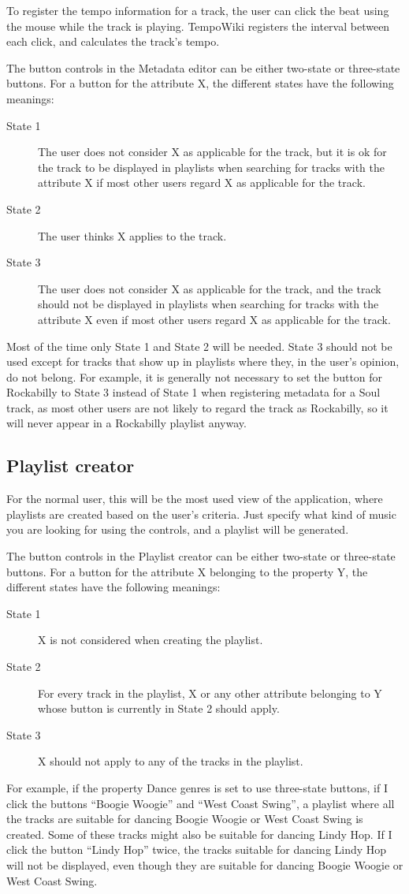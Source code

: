 \documentclass[a4paper, 12pt]{article}
\begin{document}
To register the tempo information for a track, the user can click the beat using the mouse while the track is playing. TempoWiki registers the interval between each click, and calculates the track's tempo.

The button controls in the Metadata editor can be either two-state or three-state buttons. For a button for the attribute X, the different states have the following meanings:
\begin{description}
	\item[State 1] The user does not consider X as applicable for the track, but it is ok for the track to be displayed in playlists when searching for tracks with the attribute X if most other users regard X as applicable for the track.
	\item[State 2] The user thinks X applies to the track.
	\item[State 3] The user does not consider X as applicable for the track, and the track should not be displayed in playlists when searching for tracks with the attribute X even if most other users regard X as applicable for the track.
\end{description}
Most of the time only State 1 and State 2 will be needed. State 3 should not be used except for tracks that show up in playlists where they, in the user's opinion, do not belong. For example, it is generally not necessary to set the button for Rockabilly to State 3 instead of State 1 when registering metadata for a Soul track, as most other users are not likely to regard the track as Rockabilly, so it will never appear in a Rockabilly playlist anyway.
\subsection{Playlist creator}
\label{sec:playlist}
For the normal user, this will be the most used view of the application, where playlists are created based on the user's criteria. Just specify what kind of music you are looking for using the controls, and a playlist will be generated.

The button controls in the Playlist creator can be either two-state or three-state buttons. For a button for the attribute X belonging to the property Y, the different states have the following meanings:
\begin{description}
	\item[State 1] X is not considered when creating the playlist.
	\item[State 2] For every track in the playlist, X or any other attribute belonging to Y whose button is currently in State 2 should apply.
	\item[State 3] X should not apply to any of the tracks in the playlist.
\end{description}
For example, if the property Dance genres is set to use three-state buttons, if I click the buttons ``Boogie Woogie'' and ``West Coast Swing'', a playlist where all the tracks are suitable for dancing Boogie Woogie or West Coast Swing is created. Some of these tracks might also be suitable for dancing Lindy Hop. If I click the button ``Lindy Hop'' twice, the tracks suitable for dancing Lindy Hop will not be displayed, even though they are suitable for dancing Boogie Woogie or West Coast Swing.
\end{document}
